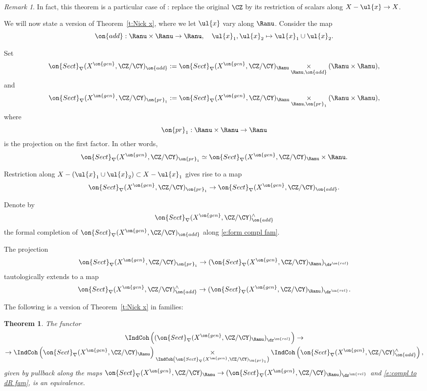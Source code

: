 \documentclass[9pt]{amsart}
\newtheorem{thm}[subsubsection]{Theorem}
\theoremstyle{remark}
\newtheorem{rem}[subsubsection]{Remark}
\theoremstyle{definition}
\theoremstyle{remark}
\newcommand{\thmref}[1]{Theorem~\ref{#1}}
\numberwithin{equation}{section}
\begin{document}
\begin{rem}
In fact, this theorem is a particular case of \cite[Corollary 4.6.10]{Ro}: replace the original $\CZ$ by its restriction of scalars along
$X-\ul{x}\to X$.
\end{rem} 

\sssec{}

We will now state a version of \thmref{t:Nick x}, where we let $\ul{x}$ vary along $\Ranu$.  Consider the map
$$\on{add}: \Ranu\times \Ranu\to \Ranu, \quad \ul{x}_1,\ul{x}_2\mapsto \ul{x}_1\cup \ul{x}_2.$$

Set
$$\on{Sect}_\nabla(X^{\on{gen}},\CZ/\CY)_{\on{add}}:=
\on{Sect}_\nabla(X^{\on{gen}},\CZ/\CY)_\Ranu \underset{\Ranu,\on{add}}\times (\Ranu\times \Ranu),$$
and
$$\on{Sect}_\nabla(X^{\on{gen}},\CZ/\CY)_{\on{pr}_1}:=
\on{Sect}_\nabla(X^{\on{gen}},\CZ/\CY)_\Ranu \underset{\Ranu,\on{pr}_1}\times (\Ranu\times \Ranu),$$
where 
$$\on{pr}_1:\Ranu\times \Ranu\to \Ranu$$
is the projection on the first factor. In other words,
$$\on{Sect}_\nabla(X^{\on{gen}},\CZ/\CY)_{\on{pr}_1}\simeq 
\on{Sect}_\nabla(X^{\on{gen}},\CZ/\CY)_\Ranu\times \Ranu.$$

\medskip

Restriction along $X-(\ul{x}_1\cup \ul{x}_2)\subset X-\ul{x}_1$ gives rise to a map
\begin{equation} \label{e:form compl fam}
\on{Sect}_\nabla(X^{\on{gen}},\CZ/\CY)_{\on{pr}_1}\to
\on{Sect}_\nabla(X^{\on{gen}},\CZ/\CY)_{\on{add}}.
\end{equation} 

\sssec{}

Denote by $$\on{Sect}_\nabla(X^{\on{gen}},\CZ/\CY)^\wedge_{\on{add}}$$ the formal completion of 
$\on{Sect}_\nabla(X^{\on{gen}},\CZ/\CY)_{\on{add}}$ along \eqref{e:form compl fam}.

\medskip

The projection
$$\on{Sect}_\nabla(X^{\on{gen}},\CZ/\CY)_{\on{pr}_1}\to (\on{Sect}_\nabla(X^{\on{gen}},\CZ/\CY)_\Ranu)_{\dr^{\on{rel}}}$$
tautologically extends to a map
\begin{equation} \label{e:compl to dR fam}
\on{Sect}_\nabla(X^{\on{gen}},\CZ/\CY)^\wedge_{\on{add}}\to
(\on{Sect}_\nabla(X^{\on{gen}},\CZ/\CY)_\Ranu)_{\dr^{\on{rel}}}.
\end{equation}

The following is a version of \thmref{t:Nick x} in families:
\begin{thm} \label{t:Nick fam}
The functor
\begin{multline} \label{e:Nick fam}
\IndCoh\left((\on{Sect}_\nabla(X^{\on{gen}},\CZ/\CY)_\Ranu)_{\dr^{\on{rel}}}\right)
\to \\
\to \IndCoh\left(\on{Sect}_\nabla(X^{\on{gen}},\CZ/\CY)_\Ranu\right) 
\underset{\IndCoh\left(\on{Sect}_\nabla(X^{\on{gen}},\CZ/\CY)_{\on{pr}_1}\right)}
\times \IndCoh\left(\on{Sect}_\nabla(X^{\on{gen}},\CZ/\CY)^\wedge_{\on{add}}\right),
\end{multline}
given by pullback along the maps
$\on{Sect}_\nabla(X^{\on{gen}},\CZ/\CY)_\Ranu\to (\on{Sect}_\nabla(X^{\on{gen}},\CZ/\CY)_\Ranu)_{\dr^{\on{rel}}}$ and \eqref{e:compl to dR fam},
is an equivalence. 
\end{thm}
\end{document}
